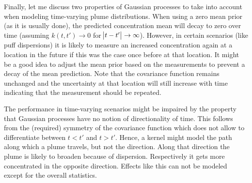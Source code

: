 Finally, let me discuss two properties of Gaussian processes to take into 
account when modeling time-varying plume distributions. When using a zero mean 
prior (as it is usually done), the predicted concentration mean will decay to 
zero over time (assuming $k(t, t') \rightarrow 0$ for $\abs{t - t'} \rightarrow 
\infty$). However, in certain scenarios (like puff dispersions) it is likely to 
measure an increased concentration again at a location in the future if this was 
the case once before at that location. It might be a good idea to adjust the 
mean prior based on the measurements to prevent a decay of the mean prediction.  
Note that the covariance function remains unchanged and the uncertainty at that 
location will still increase with time indicating that the measurement should be 
repeated.

The performance in time-varying scenarios might be impaired by the property that 
Gaussian processes have no notion of directionality of time. This follows from 
the (required) symmetry of the covariance function which does not allow to 
differentiate between $t < t'$ and $t > t'$. Hence, a kernel might model the 
path along which a plume travels, but not the direction. Along that direction 
the plume is likely to broaden because of dispersion. Respectively it gets more 
concentrated in the opposite direction. Effects like this can not be modeled 
except for the overall statistics.
